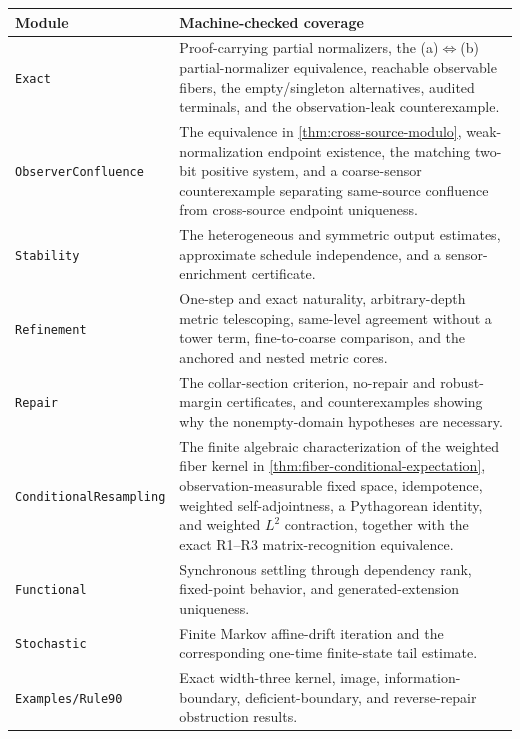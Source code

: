 \documentclass[11pt]{article}
\theoremstyle{definition}
\theoremstyle{remark}
\numberwithin{equation}{section}
\begin{document}
\begin{center}
\small
\begin{tabular}{>{\raggedright\arraybackslash}p{}>{\raggedright\arraybackslash}p{}}
\toprule
\textbf{Module} & \textbf{Machine-checked coverage}\\
\midrule
\texttt{Exact}
& Proof-carrying partial normalizers, the (a)$\Leftrightarrow$(b)
partial-normalizer equivalence, reachable
observable fibers, the empty/singleton alternatives, audited terminals, and
the observation-leak counterexample.\\
\texttt{ObserverConfluence}
& The equivalence in \cref{thm:cross-source-modulo}, weak-normalization
endpoint existence, the matching two-bit positive system, and a coarse-sensor
counterexample separating same-source confluence from cross-source endpoint
uniqueness.\\
\texttt{Stability}
& The heterogeneous and symmetric output estimates, approximate schedule
independence, and a sensor-enrichment certificate.\\
\texttt{Refinement}
& One-step and exact naturality, arbitrary-depth metric telescoping,
same-level agreement without a tower term, fine-to-coarse comparison, and the
anchored and nested metric cores.\\
\texttt{Repair}
& The collar-section criterion, no-repair and robust-margin certificates, and
counterexamples showing why the nonempty-domain hypotheses are necessary.\\
\texttt{ConditionalResampling}
& The finite algebraic characterization of the weighted fiber kernel in
\cref{thm:fiber-conditional-expectation}, observation-measurable fixed space,
idempotence, weighted self-adjointness, a Pythagorean identity, and weighted
$L^2$ contraction, together with the exact R1--R3 matrix-recognition
equivalence.\\
\texttt{Functional}
& Synchronous settling through dependency rank, fixed-point behavior, and
generated-extension uniqueness.\\
\texttt{Stochastic}
& Finite Markov affine-drift iteration and the corresponding one-time
finite-state tail estimate.\\
\texttt{Examples/Rule90}
& Exact width-three kernel, image, information-boundary, deficient-boundary,
and reverse-repair obstruction results.\\
\bottomrule
\end{tabular}
\normalsize
\end{center}
\end{document}
